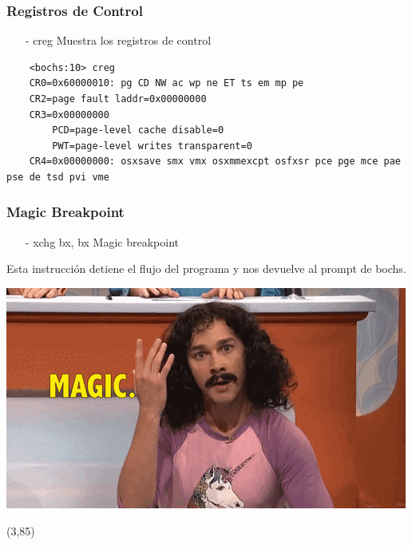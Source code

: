 \documentclass[aspectratio=169]{beamer}
\begin{document}
\begin{frame}[fragile]
\frametitle{Registros de Control}
    \begin{itemize}
        \item[-] creg \hspace{0.5cm}
    \textcolor{verdeuca}{Muestra los registros de control} %
    \end{itemize}
    \small
    \begin{verbatim}
    <bochs:10> creg
    CR0=0x60000010: pg CD NW ac wp ne ET ts em mp pe
    CR2=page fault laddr=0x00000000
    CR3=0x00000000
        PCD=page-level cache disable=0
        PWT=page-level writes transparent=0
    CR4=0x00000000: osxsave smx vmx osxmmexcpt osfxsr pce pge mce pae pse de tsd pvi vme
    \end{verbatim}
\end{frame}

\begin{frame}[fragile]
    \frametitle{Magic Breakpoint}
    \begin{itemize}
    \item[-] xchg bx, bx \hspace{0.5cm}
    \textcolor{verdeuca}{Magic breakpoint}
    \end{itemize}
    Esta instrucción detiene el flujo del programa y nos devuelve al prompt de bochs.
    \pause
    \begin{center}
    \includegraphics[scale=2]{img/magic.png}
    \end{center}
    \begin{textblock}{55}(3,85)
    \scriptsize
    \end{textblock}
\end{frame}
\end{document}
